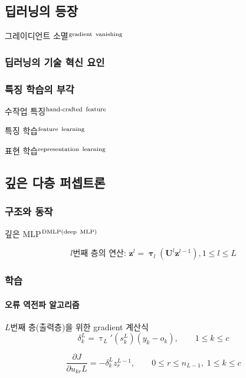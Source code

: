 \documentclass [12pt] {oblivoir}
\let\oldsubsubsection=\subsubsection
\renewcommand{\subsubsection}
{
  \filbreak
  \oldsubsubsection
}
\begin{document}
\subsection{딥러닝의 등장}

그레이디언트 소멸$^{\text{gradient\, vanishing}}$

\subsubsection{딥러닝의 기술 혁신 요인}

\subsubsection{특징 학습의 부각}

수작업 특징$^{\text{hand-crafted\, feature}}$

특징 학습$^{\text{feature\, learning}}$

표현 학습$^{\text{representation\, learning}}$

\subsection{깊은 다층 퍼셉트론}

\subsubsection{구조와 동작}

깊은 MLP$^{\text{DMLP(deep\, MLP)}}$

\begin{equation} \tag{4.5}
  l\text{번째 층의 연산: } \mathbf{z}^{l} = \boldsymbol{\uptau}_{l}(\mathbf{U}^{l}\mathbf{z}^{l-1}), 1 \le l \le L
\end{equation}

\subsubsection{학습}

\paragraph*{오류 역전파 알고리즘}\mbox{}
$L$번째 층(출력층)을 위한 gradient 계산식
\begin{equation} \tag{4.6}
  \delta_{k}^{L} = \uptau_{L}'(s_{k}^{L})(y_{k} - o_{k}), \qquad 1 \le k \le c
\end{equation}

\begin{equation} \tag{4.7}
  \frac{\partial J}{\partial u_{kr}{L}} = -\delta_{k}^{L}z_{r}^{L-1}, \qquad 0 \le r \le n_{L-1}, \; 1\le k \le c
\end{equation}
\end{document}
